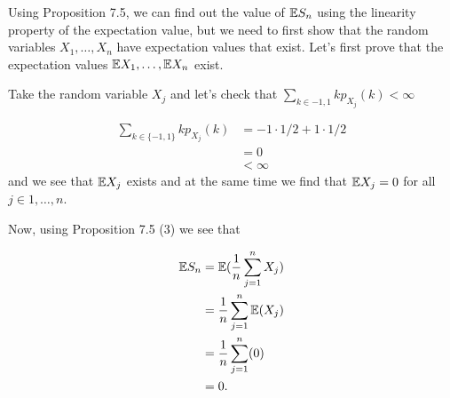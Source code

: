 
Using Proposition 7.5, we can find out the value of $ \mathbb{E} S_{n} $ using the linearity property of the
expectation value, but we need to first show that the random variables $ X_1, \dots, X_{n} $ have
expectation values that exist. Let's first prove that the expectation values $\mathbb{E} X_1, \dots, \mathbb{E}
X_{n} $ exist. 

Take the random variable $ X_{j} $ and let's check that $ \sum_{k \in {-1,1}}^{} k p_{X_{j} }(k) <
\infty  $

\begin{align*}
    \sum_{k \in \{ -1,1 \} } k  p_{X_{j} } (k) &=  -1 \cdot 1/2 + 1 \cdot 1/2\\
					       &= 0\\
					       &<\infty
\end{align*}
and we see that $ \mathbb{E} X_{j} $ exists and at the same time we find that $ \mathbb{E} X_{j} = 0 $ for all $ j
\in 1,\dots, n$.

Now, using Proposition 7.5 (3) we see that

\begin{align*}
    \mathbb{E} S_{n} &= \mathbb{E} ( \frac{1}{n} \sum_{j=1}^{n} X_{j} )\\
             &= \frac{1}{n} \sum_{j=1}^{n} \mathbb{E} (X_{j} )\\
	     &=  \frac{1}{n} \sum_{j=1}^{n} (0)\\
	     &= 0.
\end{align*}
